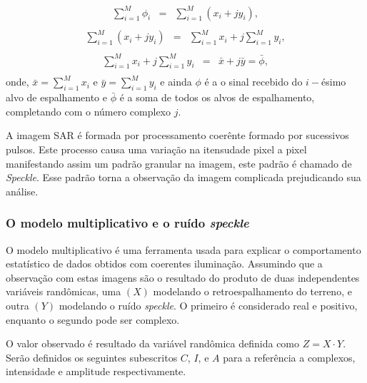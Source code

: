 \begin{equation}\label{cap_acf_12}
\begin{array}{ccc}
	\sum_{i=1}^{M}\phi_i&=&\sum_{i=1}^{M}(x_i+jy_i), \\
\end{array}
\end{equation}
\begin{equation}\label{cap_acf_13}
\begin{array}{ccc}
	\sum_{i=1}^{M}(x_i+jy_i)&=&\sum_{i=1}^{M}x_i+j\sum_{i=1}^{M}y_i, \\
\end{array}
\end{equation}
\begin{equation}\label{cap_acf_14}
\begin{array}{ccc}
	\sum_{i=1}^{M}x_i+j\sum_{i=1}^{M}y_i&=&\bar{x}+j\bar{y}=\bar{\phi}, \\
\end{array}
\end{equation}
onde, $\bar{x}=\sum_{i=1}^{M}x_i$ e $\bar{y}=\sum_{i=1}^{M}y_i$ e ainda $\phi$ é a o sinal recebido do $i-$ésimo alvo de espalhamento e $\bar{\phi}$ é a soma de todos os alvos de espalhamento, completando com o número complexo $j$.

A imagem SAR é formada por processamento coerênte formado por sucessivos pulsos. Este processo causa uma variação na itensudade pixel a pixel manifestando assim um padrão granular na imagem, este padrão é chamado de {\it Speckle}. Esse padrão torna a observação da imagem complicada prejudicando sua análise.




\subsubsection{O modelo multiplicativo e o ruído {\it speckle}}


O modelo multiplicativo é uma ferramenta usada para explicar o comportamento estatístico de dados obtidos com coerentes iluminação. Assumindo que a observação com estas imagens são o resultado do produto de duas independentes variáveis randômicas, uma $(X)$ modelando o retroespalhamento do terreno, e outra $(Y)$ modelando o ruído {\it speckle}. O primeiro é considerado real e positivo, enquanto o segundo pode ser complexo.

O valor observado é resultado da variável randômica definida como $Z=X\cdot Y$. Serão definidos os seguintes subescritos $C$, $I$, e $A$ para a referência a complexos, intensidade e amplitude respectivamente.

